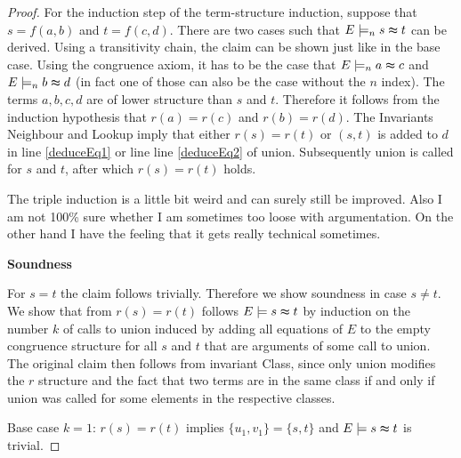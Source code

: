 \begin{proof}
For the induction step of the term-structure induction, suppose that $s = f(a,b)$ and $t = f(c,d)$.
There are two cases such that $E \models_n s \thickapprox t$ can be derived.
Using a transitivity chain, the claim can be shown just like in the base case.
Using the congruence axiom, it has to be the case that $E \models_n a \thickapprox c$ and $E \models_n b \thickapprox d$ (in fact one of those can also be the case without the $n$ index).
The terms $a,b,c,d$ are of lower structure than $s$ and $t$.
Therefore it follows from the induction hypothesis that $r(a) = r(c)$ and $r(b) = r(d)$.
The Invariants Neighbour and Lookup imply that either $r(s) = r(t)$ or $(s,t)$ is added to $d$ in line \ref{deduceEq1} or line line \ref{deduceEq2} of union.
Subsequently union is called for $s$ and $t$, after which $r(s) = r(t)$ holds.

{\color{blue} The triple induction is a little bit weird and can surely still be improved.
Also I am not 100\% sure whether I am sometimes too loose with argumentation.
On the other hand I have the feeling that it gets really technical sometimes.}

\textbf{Soundness}

For $s = t$ the claim follows trivially.
Therefore we show soundness in case $s \neq t$.
We show that from $r(s) = r(t)$ follows $E \models s \thickapprox t$ by induction on the number $k$ of calls to union induced by adding all equations of $E$ to the empty congruence structure for all $s$ and $t$ that are arguments of some call to union.
The original claim then follows from invariant Class, since only union modifies the $r$ structure and the fact that two terms are in the same class if and only if union was called for some elements in the respective classes.

Base case $k = 1$: $r(s) = r(t)$ implies $\{u_1,v_1\} = \{s,t\}$ and $E \models s \thickapprox t$ is trivial.



\end{proof}
